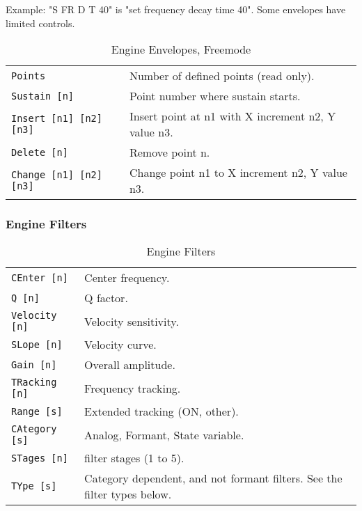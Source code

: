 Example: "S FR D T 40" is "set frequency decay time 40".
Some envelopes have limited controls.

   \begin{table}[H]
      \centering
      \caption{Engine Envelopes, Freemode}
      \label{table:yoshimi_engine_envelopes_freemode}
      \begin{tabular}{l l}

\texttt{Points} &
   Number of defined points (read only). \\
\texttt{Sustain [n]} &
   Point number where sustain starts. \\
\texttt{Insert [n1] [n2] [n3]} &
   Insert point at n1 with X increment n2, Y value n3. \\
\texttt{Delete [n]} &
   Remove point n. \\
\texttt{Change [n1] [n2] [n3]} &
   Change point n1 to X increment n2, Y value n3. \\

      \end{tabular}
   \end{table}

\subsubsection{Engine Filters}
\label{subsec:command_line_engine_filters}

   \begin{table}[H]
      \centering
      \caption{Engine Filters}
      \label{table:yoshimi_engine_filters}
      \begin{tabular}{l l}

\texttt{CEnter [n]} &
   Center frequency. \\
\texttt{Q [n]} &
   Q factor.   \\
\texttt{Velocity [n]} &
   Velocity sensitivity.   \\
\texttt{SLope [n]} &
   Velocity curve.   \\
\texttt{Gain [n]} &
   Overall amplitude.   \\
\texttt{TRacking [n]} &
   Frequency tracking.  \\
\texttt{Range [s]} &
   Extended tracking (ON, {other}). \\
\texttt{CAtegory [s]} &
   Analog, Formant, State variable. \\
\texttt{STages [n]} &
   filter stages (1 to 5). \\
\texttt{TYpe [s]} &
   Category dependent, and not formant filters.  See the filter types below.   \\

      \end{tabular}
   \end{table}

